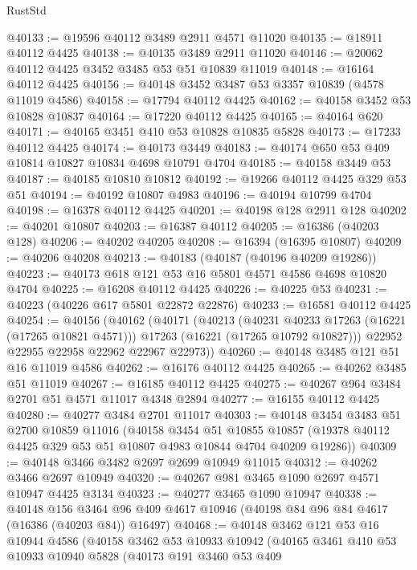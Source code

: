 \begin{lexlean}{RustStd}
\begin{coremodule}
@40133 := @19596 @40112 @3489 @2911 @4571 @11020
@40135 := @18911 @40112 @4425
@40138 := @40135 @3489 @2911 @11020
@40146 := @20062 @40112 @4425 @3452 @3485 @53 @51 @10839 @11019
@40148 := @16164 @40112 @4425
@40156 := @40148 @3452 @3487 @53 @3357 @10839 (@4578 @11019 @4586)
@40158 := @17794 @40112 @4425
@40162 := @40158 @3452 @53 @10828 @10837
@40164 := @17220 @40112 @4425
@40165 := @40164 @620
@40171 := @40165 @3451 @410 @53 @10828 @10835 @5828
@40173 := @17233 @40112 @4425
@40174 := @40173 @3449
@40183 := @40174 @650 @53 @409 @10814 @10827 @10834 @4698 @10791 @4704
@40185 := @40158 @3449 @53
@40187 := @40185 @10810 @10812
@40192 := @19266 @40112 @4425 @329 @53 @51
@40194 := @40192 @10807 @4983
@40196 := @40194 @10799 @4704
@40198 := @16378 @40112 @4425
@40201 := @40198 @128 @2911 @128
@40202 := @40201 @10807
@40203 := @16387 @40112
@40205 := @16386 (@40203 @128)
@40206 := @40202 @40205
@40208 := @16394 (@16395 @10807)
@40209 := @40206 @40208
@40213 := @40183 (@40187 (@40196 @40209 @19286))
@40223 := @40173 @618 @121 @53 @16 @5801 @4571 @4586 @4698 @10820 @4704
@40225 := @16208 @40112 @4425
@40226 := @40225 @53
@40231 := @40223 (@40226 @617 @5801 @22872 @22876)
@40233 := @16581 @40112 @4425
@40254 := @40156
    (@40162
      (@40171
        (@40213
          (@40231 @40233 @17263 (@16221 (@17265 @10821 @4571)))
          @17263
          (@16221 (@17265 @10792 @10827)))
        @22952
        @22955
        @22958
        @22962
        @22967
        @22973))
@40260 := @40148 @3485 @121 @51 @16 @11019 @4586
@40262 := @16176 @40112 @4425
@40265 := @40262 @3485 @51 @11019
@40267 := @16185 @40112 @4425
@40275 := @40267 @964 @3484 @2701 @51 @4571 @11017 @4348 @2894
@40277 := @16155 @40112 @4425
@40280 := @40277 @3484 @2701 @11017
@40303 := @40148
    @3454
    @3483
    @51
    @2700
    @10859
    @11016
    (@40158
      @3454
      @51
      @10855
      @10857
      (@19378 @40112 @4425 @329 @53 @51 @10807 @4983 @10844 @4704 @40209 @19286))
@40309 := @40148 @3466 @3482 @2697 @2699 @10949 @11015
@40312 := @40262 @3466 @2697 @10949
@40320 := @40267 @981 @3465 @1090 @2697 @4571 @10947 @4425 @3134
@40323 := @40277 @3465 @1090 @10947
@40338 := @40148
    @156
    @3464
    @96
    @409
    @4617
    @10946
    (@40198 @84 @96 @84 @4617 (@16386 (@40203 @84)) @16497)
@40468 := @40148
    @3462
    @121
    @53
    @16
    @10944
    @4586
    (@40158
      @3462
      @53
      @10933
      @10942
      (@40165
        @3461
        @410
        @53
        @10933
        @10940
        @5828
        (@40173
          @191
          @3460
          @53
          @409

\end{coremodule}
\end{lexlean}
